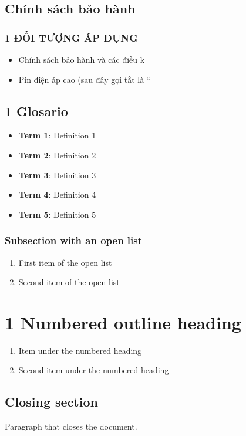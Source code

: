 \documentclass[11pt,a4paper]{article}
\begin{document}
\subsection{Chính sách bảo hành}

\subsubsection{1 ĐỐI TƯỢNG ÁP DỤNG}

\begin{itemize}
\item Chính sách bảo hành và các điều k
\item Pin điện áp cao (sau đây gọi tắt là “
\end{itemize}

\subsection{1 Glosario}

\begin{itemize}
\item \textbf{Term 1}: Definition 1
\item \textbf{Term 2}: Definition 2
\item \textbf{Term 3}: Definition 3
\item \textbf{Term 4}: Definition 4
\item \textbf{Term 5}: Definition 5
\end{itemize}

\subsubsection{Subsection with an open list}

\begin{enumerate}
\item First item of the open list
\item Second item of the open list
\end{enumerate}

\section{1 Numbered outline heading}

\begin{enumerate}
\item Item under the numbered heading
\item Second item under the numbered heading
\end{enumerate}

\subsection{Closing section}

Paragraph that closes the document.
\end{document}
